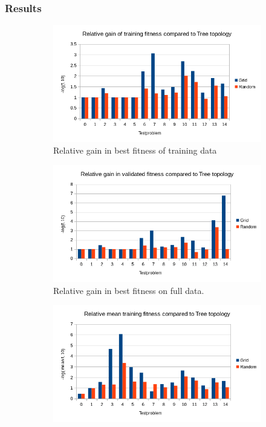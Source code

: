 \subsubsection{Results}
\begin{figure}
    \centering
    \begin{subfigure}{0.6\textwidth}
    \centering
        \includegraphics[width=0.8\linewidth]{figures/distributedbesttraining.png}
        \caption{Relative gain in best fitness of training data}
    \end{subfigure}%
    \begin{subfigure}{0.6\textwidth}
    \centering
        \includegraphics[width=0.8\linewidth]{figures/distributedbestvalidated.png}
        \caption{Relative gain in best fitness on full data.}
    \end{subfigure}
        \begin{subfigure}{0.6\textwidth}
    \centering
        \includegraphics[width=0.8\linewidth]{figures/distributedmeantraining.png}

\end{subfigure}
\end{figure}
